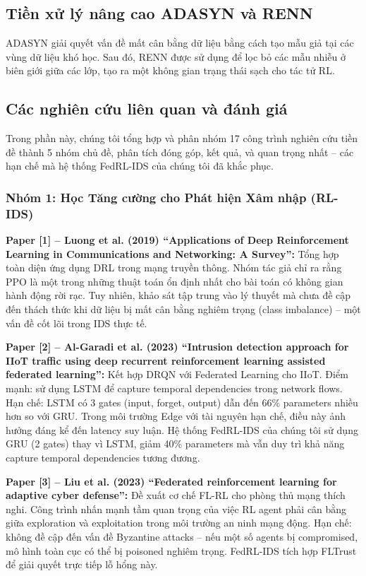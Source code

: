 \documentclass[12pt,a4paper]{article}
\begin{document}
\subsection{Tiền xử lý nâng cao ADASYN và RENN}
ADASYN giải quyết vấn đề mất cân bằng dữ liệu bằng cách tạo mẫu giả tại các vùng dữ liệu khó học. Sau đó, RENN được sử dụng để lọc bỏ các mẫu nhiễu ở biên giới giữa các lớp, tạo ra một không gian trạng thái sạch cho tác tử RL.

\subsection{Các nghiên cứu liên quan và đánh giá}\label{sec:related_work}
Trong phần này, chúng tôi tổng hợp và phân nhóm 17 công trình nghiên cứu tiền đề thành 5 nhóm chủ đề, phân tích đóng góp, kết quả, và quan trọng nhất -- các hạn chế mà hệ thống FedRL-IDS của chúng tôi đã khắc phục.

\subsubsection{Nhóm 1: Học Tăng cường cho Phát hiện Xâm nhập (RL-IDS)}

\textbf{Paper [1] -- Luong et al. (2019) ``Applications of Deep Reinforcement Learning in Communications and Networking: A Survey'': } Tổng hợp toàn diện ứng dụng DRL trong mạng truyền thông. Nhóm tác giả chỉ ra rằng PPO là một trong những thuật toán ổn định nhất cho bài toán có không gian hành động rời rạc. Tuy nhiên, khảo sát tập trung vào lý thuyết mà chưa đề cập đến thách thức khi dữ liệu bị mất cân bằng nghiêm trọng (class imbalance) -- một vấn đề cốt lõi trong IDS thực tế.

\textbf{Paper [2] -- Al-Garadi et al. (2023) ``Intrusion detection approach for IIoT traffic using deep recurrent reinforcement learning assisted federated learning'': } Kết hợp DRQN với Federated Learning cho IIoT. Điểm mạnh: sử dụng LSTM để capture temporal dependencies trong network flows. Hạn chế: LSTM có 3 gates (input, forget, output) dẫn đến 66\% parameters nhiều hơn so với GRU. Trong môi trường Edge với tài nguyên hạn chế, điều này ảnh hưởng đáng kể đến latency suy luận. Hệ thống FedRL-IDS của chúng tôi sử dụng GRU (2 gates) thay vì LSTM, giảm 40\% parameters mà vẫn duy trì khả năng capture temporal dependencies tương đương.

\textbf{Paper [3] -- Liu et al. (2023) ``Federated reinforcement learning for adaptive cyber defense'': } Đề xuất cơ chế FL-RL cho phòng thủ mạng thích nghi. Công trình nhấn mạnh tầm quan trọng của việc RL agent phải cân bằng giữa exploration và exploitation trong môi trường an ninh mạng động. Hạn chế: không đề cập đến vấn đề Byzantine attacks -- nếu một số agents bị compromised, mô hình toàn cục có thể bị poisoned nghiêm trọng. FedRL-IDS tích hợp FLTrust để giải quyết trực tiếp lỗ hổng này.
\end{document}
